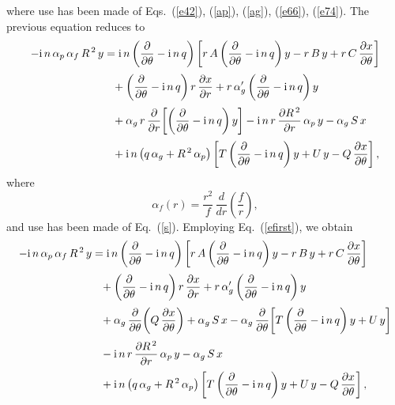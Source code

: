\documentclass[12pt,prb,aps]{revtex4-1}
\begin{document}
where use has been made of Eqs.~(\ref{e42}), (\ref{ap}), (\ref{ag}), (\ref{e66}),  (\ref{e74}). The
previous equation reduces to
\begin{align}
-{\rm i}\,n\,\alpha_p\,\alpha_f\,R^{\,2}\,y&={\rm i}\,n\left(\frac{\partial}{\partial\theta}-{\rm i}\,n\,q\right)\left[r\,A\left(\frac{\partial}{\partial \theta}-{\rm i}\,n\,q\right)y-r\,B\,y+r\,C\,\frac{\partial x}{\partial\theta}\right]\nonumber\\[0.5ex]&\phantom= +\left(\frac{\partial}{\partial\theta}-{\rm i}\,n\,q\right)r\,\frac{\partial x}{\partial r}  +r\,\alpha_g'\left(\frac{\partial}{\partial\theta}-{\rm i}\,n\,q\right)y \nonumber\\[0.5ex]
&\phantom{=}+ \alpha_g\,r\,\frac{\partial}{\partial r}\!\left[\left(\frac{\partial}{\partial\theta}-{\rm i}\,n\,q\right)y\right]
-{\rm i}\,n\,r\,\frac{\partial R^{\,2}}{\partial r}\,\alpha_p\,y-\alpha_g\,S\,x\nonumber\\[0.5ex]
&\phantom{=} +{\rm i}\,n\left(q\,\alpha_g + R^{\,2}\,\alpha_p\right) \left[T\left(\frac{\partial}{\partial\theta}-{\rm i}\,n\,q\right)y + U\,y -Q\,\frac{\partial x}{\partial\theta}\right],
\end{align}
where
\begin{equation}\label{af}
\alpha_f(r) = \frac{r^2}{f}\,\frac{d}{dr}\!\left(\frac{f}{r}\right),
\end{equation}
and use has been made of Eq.~(\ref{s}). 
Employing Eq.~(\ref{efirst}), we obtain
\begin{align}
-{\rm i}\,n\,\alpha_p\,\alpha_f\,R^{\,2}\,y&={\rm i}\,n\left(\frac{\partial}{\partial\theta}-{\rm i}\,n\,q\right)\left[r\,A\left(\frac{\partial}{\partial \theta}-{\rm i}\,n\,q\right)y-r\,B\,y+r\,C\,\frac{\partial x}{\partial\theta}\right]\nonumber\\[0.5ex]&\phantom= +\left(\frac{\partial}{\partial\theta}-{\rm i}\,n\,q\right)r\,\frac{\partial x}{\partial r}  +r\,\alpha_g'\left(\frac{\partial}{\partial\theta}-{\rm i}\,n\,q\right)y \nonumber\\[0.5ex]
&\phantom{=}+ \alpha_g\,\frac{\partial}{\partial\theta}\!\left(Q\,\frac{\partial x}{\partial\theta}\right)
+\alpha_g\,S\,x -\alpha_g\,\frac{\partial}{\partial\theta}\!\left[T\left(\frac{\partial}{\partial\theta}-{\rm i}\,n\,q\right)y+U\,y\right]\nonumber\\[0.5ex]&\phantom{=}
-{\rm i}\,n\,r\,\frac{\partial R^{\,2}}{\partial r}\,\alpha_p\,y-\alpha_g\,S\,x\nonumber\\[0.5ex]
&\phantom{=} +{\rm i}\,n\left(q\,\alpha_g + R^{\,2}\,\alpha_p\right) \left[T\left(\frac{\partial}{\partial\theta}-{\rm i}\,n\,q\right)y + U\,y -Q\,\frac{\partial x}{\partial\theta}\right],
\end{align}
\end{document}
